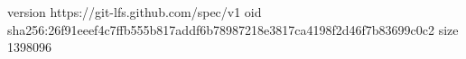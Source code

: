 version https://git-lfs.github.com/spec/v1
oid sha256:26f91eeef4c7ffb555b817addf6b78987218e3817ca4198f2d46f7b83699c0c2
size 1398096
